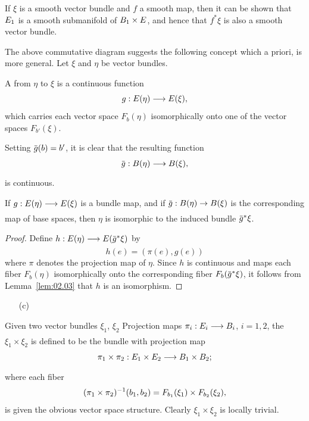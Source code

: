 \documentclass[../main]{subfiles}
\begin{document}
\begin{remark} \label{rem:03.01}
If $\xi$ is a smooth vector bundle and $f$ a smooth map, then it can be shown that $E_1$ is a smooth submanifold of $B_1 \times E$, and hence that $f^*\xi$ is also a smooth vector bundle.
\end{remark}


The above commutative diagram suggests the following concept which a priori, is more general. Let $\xi$ and $\eta$ be vector bundles.


\begin{definition}\label{def:03.01}
A  from $\eta$ to $\xi$ is a continuous function
\[
g:E(\eta)\longrightarrow E(\xi),
\]
which carries each vector space $F_b(\eta)$ isomorphically onto one of the vector spaces $F_{b'}(\xi)$.
\end{definition}

Setting $\xoverline{g}(b) = b'$, it is clear that the resulting function
\[
\xoverline{g} : \B(\eta)\varrightarrow{} \B(\xi),
\]
is continuous.


\begin{lemma}\label{lem:03.01}
If $g : \total(\eta)\varrightarrow{} \total(\xi)$ is a bundle map, and if $\xoverline{g} : \B(\eta)\rightarrow \B(\xi)$  is the corresponding map of base spaces, then $\eta$ is isomorphic to the induced bundle $\xoverline{g}^*\xi$.
\end{lemma}


\begin{proof}
Define $h : \total(\eta) \varrightarrow{} \total(\xoverline{g}^*\xi)$ by
\[
h(e)=(\pi(e),g(e))
\]
where $\pi$ denotes the projection map of $\eta$. Since $h$ is continuous and maps each fiber $F_b(\eta)$ isomorphically onto the corresponding fiber $F_b(\xoverline{g}^*\xi)$, it follows from Lemma~\ref{lem:02.03} that $h$ is an isomorphism.
\end{proof}


\begin{enumerate}
    \item[(c)] 
\end{enumerate}
Given two vector bundles $\xi_1$, $\xi_2$ Projection maps $\pi_i : \total_i \varrightarrow{} \B_i$, $i =1, 2$, the   $\xi_1\times\xi_2$ is defined to be the bundle with projection map
\[
\pi_1 \times \pi_2 : \total_1 \times \total_2 \varrightarrow{} \B_1\times\B_2;
\]
where each fiber
\[
(\pi_{1} \times \pi_{2})^{-1} (b_{1}, b_{2}) = F_{b_{1}}(\xi_{1}) \times F_{b_{2}} (\xi_{2}),
\]
is given the obvious vector space structure. Clearly $\xi_1\times\xi_2$ is locally trivial.
\end{document}
